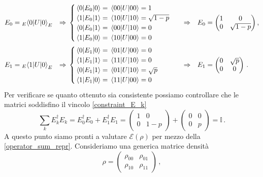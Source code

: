 \begin{align*}
    E_0 &= {}_E \! \mel{0}{U}{0}_E &\Rightarrow& \;
    \begin{cases}
        \mel{0}{E_0}{0}=\mel{00}{U}{00}=1 \\
        \mel{1}{E_0}{1}=\mel{10}{U}{10}=\sqrt{1-p} \\
        \mel{0}{E_0}{1}=\mel{00}{U}{10}=0 \\
        \mel{1}{E_0}{0}=\mel{10}{U}{00}=0
    \end{cases}
    &\Rightarrow&
    &E_0 &= 
    \begin{pmatrix}
        1 & 0 \\
        0 & \sqrt{1-p}
    \end{pmatrix} , \\
    E_1 &= {}_E \! \mel{1}{U}{0}_E &\Rightarrow& \;
    \begin{cases}
        \mel{0}{E_1}{0}=\mel{01}{U}{00}=0 \\
        \mel{1}{E_1}{1}=\mel{11}{U}{10}=0 \\
        \mel{0}{E_1}{1}=\mel{01}{U}{10}=\sqrt p \\
        \mel{1}{E_1}{0}=\mel{11}{U}{00}=0
    \end{cases}
    &\Rightarrow& 
    &E_1 &= 
    \begin{pmatrix}
        0 & \sqrt p \\
        0 & 0
    \end{pmatrix} \, .
\end{align*}
Per verificare se quanto ottenuto sia consistente possiamo controllare che le matrici soddisfino il vincolo \eqref{constraint_E_k}
\begin{equation*}
    \sum_k E_k^\dagger E_k = E_0^\dagger E_0+E_1^\dagger E_1 = 
    \begin{pmatrix}
    1 & 0 \\
    0 & 1-p
    \end{pmatrix} +
    \begin{pmatrix}
    0 & 0 \\
    0 & p
    \end{pmatrix}
    = \mathbb{I} \, .
\end{equation*}
A questo punto siamo pronti a valutare $\mathcal{E}(\rho)$ per mezzo della \eqref{operator_sum_repr}. Consideriamo una generica matrice densità
\begin{equation*}
    \rho = \begin{pmatrix}
    \rho_{00} & \rho_{01} \\
    \rho_{10} & \rho_{11}
    \end{pmatrix} \, ,
\end{equation*}
